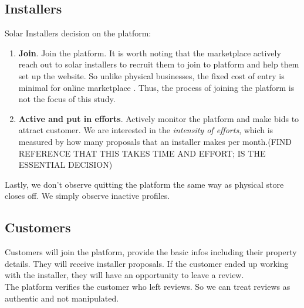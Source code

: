 \documentclass[msom,blindrev]{informs3}
\begin{document}
\subsection{Installers}
Solar Installers decision on the platform: 

\begin{enumerate}
\item  \textbf{Join}. Join the platform. It is worth noting that the marketplace actively reach out to solar installers to recruit them to join to platform and help them set up the website. So unlike physical businesses, the fixed cost of entry is minimal for online marketplace \citep{haddad2015consumer}. Thus, the process of joining the platform is not the focus of this study. \\
\item  \textbf{Active and put in efforts}. Actively monitor the platform and make bids to attract customer. We are interested in the\textit{ intensity of efforts}, which is measured by how many proposals that an installer makes per month.(FIND REFERENCE THAT THIS TAKES TIME AND EFFORT; IS THE ESSENTIAL DECISION)\\
\end{enumerate}

Lastly, we don't observe quitting the platform the same way as physical store closes off. We simply observe inactive profiles. 


\subsection{Customers}
Customers will join the platform, provide the basic infos including their property details. They will receive installer proposals. If the customer ended up working with the installer, they will have an opportunity to leave a review. \\
The platform verifies the customer who left reviews. So we can treat reviews as authentic and not manipulated. 

 
\end{document}

